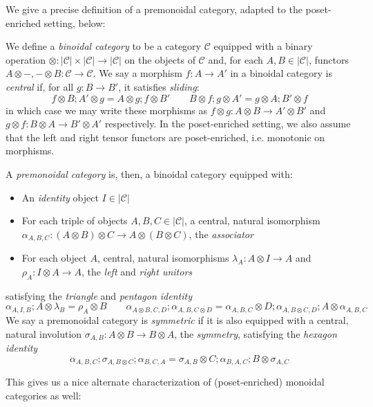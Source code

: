 \documentclass[acmsmall,screen,review]{acmart}
\newcommand{\mc}[1]{\ensuremath{\mathcal{#1}}}
\begin{document}
We give a precise definition of a premonoidal category, adapted to the poset-enriched setting,
below:
\begin{definition}
  We define a \emph{binoidal category} to be a category $\mc{C}$ equipped with a binary operation
  $\otimes : |\mc{C}| \times |\mc{C}| \to |\mc{C}|$ on the objects of $\mc{C}$ and, for each $A, B
  \in |\mc{C}|$, functors $A \otimes -, - \otimes B : \mc{C} \to \mc{C}$. We say a morphism $f : A
  \to A'$ in a binoidal category is \emph{central} if, for all $g : B \to B'$, it satisfies
  \emph{sliding}:
  $$
  f \otimes B ; A' \otimes g = A \otimes g ; f \otimes B' \qquad
  B \otimes f ; g \otimes A' = g \otimes A ; B' \otimes f
  $$
  in which case we may write these morphisms as $f \otimes g : A \otimes B \to A' \otimes B'$ and $g
  \otimes f : B \otimes A \to B' \otimes A'$ respectively. In the poset-enriched setting, we also
  assume that the left and right tensor functors are poset-enriched, i.e. monotonic on morphisms.
  
  A \emph{premonoidal category} is, then, a
  binoidal category equipped with:
  \begin{itemize}
    \item An \emph{identity} object $I \in |\mc{C}|$
    \item For each triple of objects $A, B, C \in |\mc{C}|$, a central, natural isomorphism
    $\alpha_{A, B, C} : (A \otimes B) \otimes C \to A \otimes (B \otimes C)$, the \emph{associator}
    \item For each object $A$, central, natural isomorphisms $\lambda_A : A \otimes I \to A$ and
    $\rho_A : I \otimes A \to A$, the \emph{left} and \emph{right unitors}
  \end{itemize}
  satisfying the \emph{triangle} and \emph{pentagon identity}
  $$
  \alpha_{A, I, B} ; A \otimes \lambda_B = \rho_A \otimes B \qquad
  \alpha_{A \otimes B, C, D} ; \alpha_{A, B, C \otimes D}
  = \alpha_{A, B, C} \otimes D ; \alpha_{A, B \otimes C, D} ; A \otimes \alpha_{A, B, C}
  $$
  We say a premonoidal category is \emph{symmetric} if it is also equipped with a central, natural
  involution $\sigma_{A, B} : A \otimes B \to B \otimes A$, the \textit{symmetry}, satisfying the
  \emph{hexagon identity}
  $$
  \alpha_{A, B, C} ; \sigma_{A, B \otimes C} ; \alpha_{B, C, A}
  = \sigma_{A, B} \otimes C ; \alpha_{B, A, C} ; B \otimes \sigma_{A, C}
  $$
\end{definition}
This gives us a nice alternate characterization of (poset-enriched) monoidal categories as well:
\end{document}

